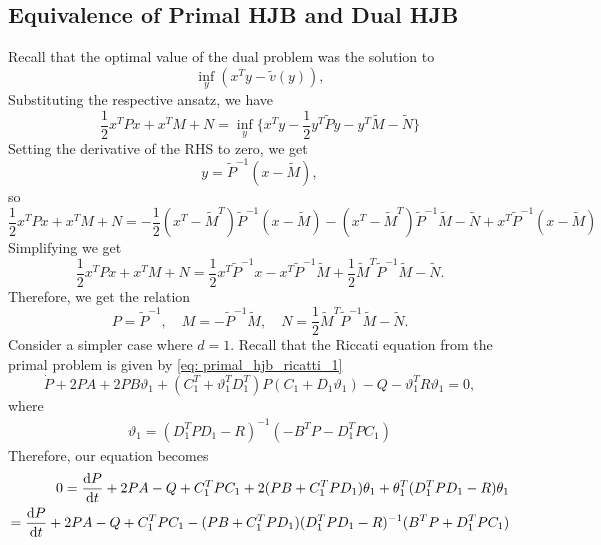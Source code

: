 \subsection{Equivalence of Primal HJB and Dual HJB}
Recall that the optimal value of the dual problem was the solution to 
\begin{equation*}
    \inf_y (x^T y - \tilde{v}(y)),
\end{equation*}
Substituting the respective ansatz, we have
\begin{equation*}
    \frac12 x^T P x + x^T M + N = \inf_y \bigg\{ x^T y - \frac12 y^T \tilde{P} y - y^T \tilde{M} - \tilde{N}  \bigg\}
\end{equation*}
Setting the derivative of the RHS to zero, we get 
\begin{equation*}
    y = \tilde{P}^{-1}(x - \tilde{M}),
\end{equation*}
so
\begin{equation*}
    \frac12 x^T P x + x^T M + N  = - \frac12 (x^T - \tilde{M}^T)\tilde{P}^{-1} (x-\tilde{M}) - (x^T - \tilde{M}^T)\tilde{P}^{-1} \tilde{M} - \tilde{N} + x^T \tilde{P}^{-1}(x - \tilde{M})
\end{equation*}
Simplifying we get
\begin{equation*}
    \frac12 x^T P x + x^T M + N = \frac12 x^T \tilde{P}^{-1}x - x^T \tilde{P}^{-1}\tilde{M} + \frac12 \tilde{M}^T \tilde{P}^{-1} \tilde{M} - \tilde{N}.
\end{equation*}
Therefore, we get the relation
\begin{equation*}
    P = \tilde{P}^{-1}, \quad M = -\tilde{P}^{-1} \tilde{M}, \quad N =  \frac12 \tilde{M}^T \tilde{P}^{-1} \tilde{M} - \tilde{N}.
\end{equation*}
Consider a simpler case where $d=1$. %
Recall that the Riccati equation from the primal problem is given by \eqref{eq: primal_hjb_ricatti_1}
\begin{equation*}
     \dot{P}  +  2P A + 2P B \vartheta_1 + (C_1^T + \vartheta_1^T D_1^T)P(C_1 + D_1 \vartheta_1) 
     -  Q -  \vartheta_1^T R \vartheta_1 = 0,
\end{equation*}
where 
\begin{align*}
    \vartheta_1 = ( D_1^T  P D_1 - R)^{-1} ( - B^T  P - D_1^T  P C_1 )
\end{align*}
Therefore, our equation becomes
\begin{align*}
    0 = \frac{\mathrm{d} P}{\mathrm{d} t} + 2 PA - Q + C_1^T P C_1 + 2 (P B + C_1^T P D_1) \theta_1 + \theta_1^T (D_1^T P D_1 - R)\theta_1\\
    = \frac{\mathrm{d} P}{\mathrm{d} t} + 2 PA - Q + C_1^T P C_1 - (P B + C_1^T P D_1) ( D_1^T  P D_1 - R)^{-1} (B^T  P + D_1^T  P C_1 )
\end{align*}
